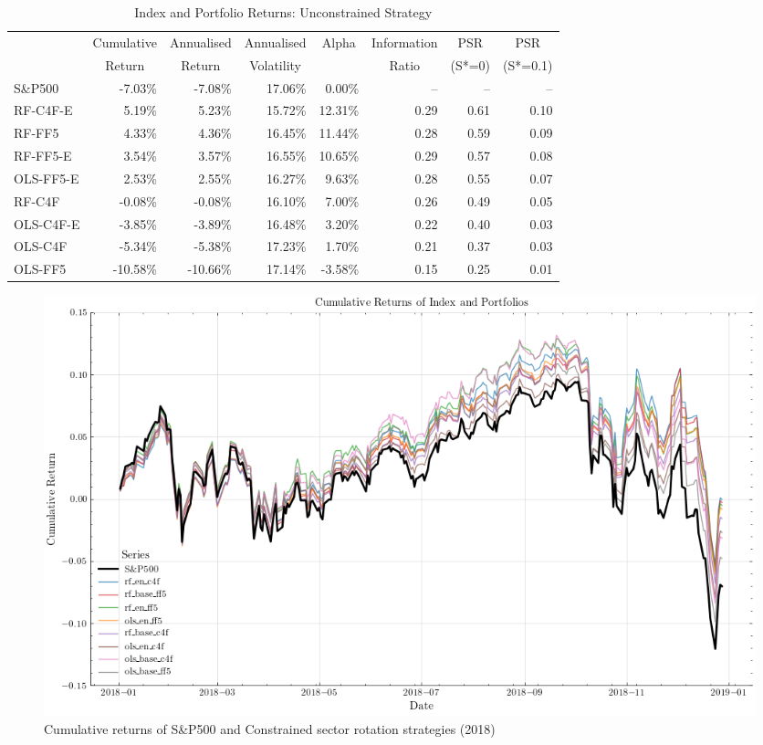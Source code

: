 \begin{table}[H]
\centering
\caption{Index and Portfolio Returns: Unconstrained Strategy}
\label{tab:unconstr}
\begin{tabular}{lrrrrrrr}
\toprule
{} & \multicolumn{1}{c}{Cumulative} & \multicolumn{1}{c}{Annualised} & \multicolumn{1}{c}{Annualised} & \multicolumn{1}{c}{Alpha} & \multicolumn{1}{c}{Information} & \multicolumn{1}{c}{PSR} & \multicolumn{1}{c}{PSR} \\
{} & \multicolumn{1}{c}{Return} & \multicolumn{1}{c}{Return} & \multicolumn{1}{c}{Volatility} & {} & \multicolumn{1}{c}{Ratio} & \multicolumn{1}{c}{(S*=0)} & \multicolumn{1}{c}{(S*=0.1)} \\
\midrule
S\&P500 & -7.03\% & -7.08\% & 17.06\% & 0.00\% & -- & -- & -- \\
RF-C4F-E & 5.19\% & 5.23\% & 15.72\% & 12.31\% & 0.29 & 0.61 & 0.10 \\
RF-FF5 & 4.33\% & 4.36\% & 16.45\% & 11.44\% & 0.28 & 0.59 & 0.09 \\
RF-FF5-E & 3.54\% & 3.57\% & 16.55\% & 10.65\% & 0.29 & 0.57 & 0.08 \\
OLS-FF5-E & 2.53\% & 2.55\% & 16.27\% & 9.63\% & 0.28 & 0.55 & 0.07 \\
RF-C4F & -0.08\% & -0.08\% & 16.10\% & 7.00\% & 0.26 & 0.49 & 0.05 \\
OLS-C4F-E & -3.85\% & -3.89\% & 16.48\% & 3.20\% & 0.22 & 0.40 & 0.03 \\
OLS-C4F & -5.34\% & -5.38\% & 17.23\% & 1.70\% & 0.21 & 0.37 & 0.03 \\
OLS-FF5 & -10.58\% & -10.66\% & 17.14\% & -3.58\% & 0.15 & 0.25 & 0.01 \\
\bottomrule
\end{tabular}
\end{table}

\begin{figure}[H]
    \centering
    \includegraphics[width=\textwidth]{plots/results/contrained_cum_ret_plot.png}
    \caption{Cumulative returns of S\&P500 and Constrained sector rotation strategies (2018)}\label{fig:constr_cum_ret_plot}
\end{figure}

